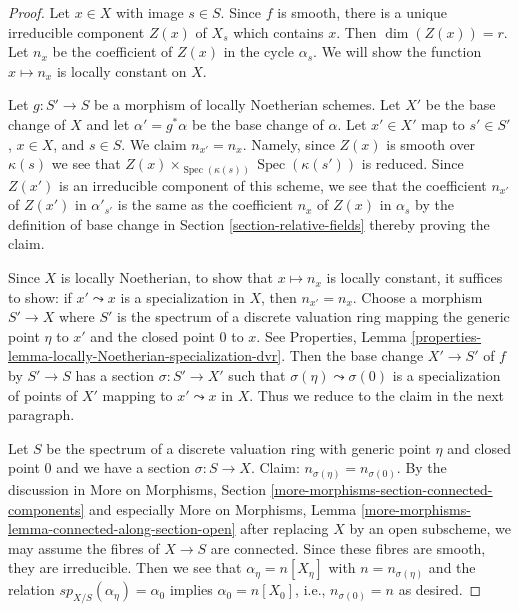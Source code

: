 \documentclass{stacks-project}
\theoremstyle{plain}
\theoremstyle{definition}
\theoremstyle{remark}
\numberwithin{equation}{subsection}
\def\Spec{\mathop{\mathrm{Spec}}}
\begin{document}
\begin{proof}
Let $x \in X$ with image $s \in S$. Since $f$ is smooth, there is a
unique irreducible component $Z(x)$ of $X_s$ which contains $x$.
Then $\dim(Z(x)) = r$.
Let $n_x$ be the coefficient of $Z(x)$ in the cycle $\alpha_s$.
We will show the function $x \mapsto n_x$ is locally constant on $X$.

\medskip\noindent
Let $g : S' \to S$ be a morphism of locally Noetherian schemes.
Let $X'$ be the base change of $X$ and let $\alpha' = g^*\alpha$
be the base change of $\alpha$. Let $x' \in X'$ map to $s' \in S'$,
$x \in X$, and $s \in S$. We claim $n_{x'} = n_x$. Namely, since $Z(x)$
is smooth over $\kappa(s)$ we see that
$Z(x) \times_{\Spec(\kappa(s))} \Spec(\kappa(s'))$
is reduced. Since $Z(x')$ is an irreducible component
of this scheme, we see that the coefficient $n_{x'}$ of $Z(x')$
in $\alpha'_{s'}$ is the same as the coefficient $n_x$ of $Z(x)$
in $\alpha_s$ by the definition of base change in
Section \ref{section-relative-fields}
thereby proving the claim.

\medskip\noindent
Since $X$ is locally Noetherian, to show that $x \mapsto n_x$
is locally constant, it suffices to show: if $x' \leadsto x$
is a specialization in $X$, then $n_{x'} = n_x$.
Choose a morphism $S' \to X$ where $S'$ is the spectrum of a discrete
valuation ring mapping the generic point $\eta$ to $x'$ and the closed point
$0$ to $x$. See Properties, Lemma
\ref{properties-lemma-locally-Noetherian-specialization-dvr}.
Then the base change $X' \to S'$ of $f$ by $S' \to S$
has a section $\sigma : S' \to X'$ such that $\sigma(\eta) \leadsto \sigma(0)$
is a specialization of points of $X'$ mapping to $x' \leadsto x$ in $X$.
Thus we reduce to the claim in the next paragraph.

\medskip\noindent
Let $S$ be the spectrum of a discrete valuation ring with
generic point $\eta$ and closed point $0$ and we have a section
$\sigma : S  \to X$. Claim: $n_{\sigma(\eta)} = n_{\sigma(0)}$.
By the discussion in More on Morphisms, Section
\ref{more-morphisms-section-connected-components} and especially
More on Morphisms, Lemma \ref{more-morphisms-lemma-connected-along-section-open}
after replacing $X$ by an open subscheme, we may assume the
fibres of $X \to S$ are connected. Since these fibres
are smooth, they are irreducible. Then we see that $\alpha_\eta = n[X_\eta]$
with $n = n_{\sigma(\eta)}$ and the relation $sp_{X/S}(\alpha_\eta) = \alpha_0$
implies $\alpha_0 = n[X_0]$, i.e., $n_{\sigma(0)} = n$ as desired.
\end{proof}
\end{document}
